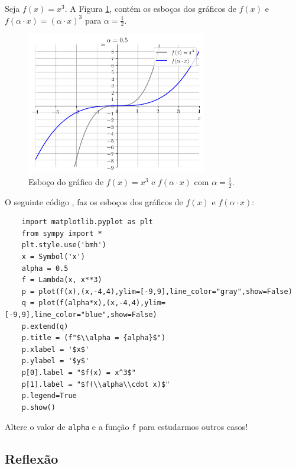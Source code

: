 \begin{ex}
  Seja $f(x) = x^3$. A Figura \ref{fig:ex_dilahoriz}, contém os esboços dos gráficos de $f(x)$ e $f(\alpha\cdot x) = (\alpha \cdot x)^3$ para $\alpha = \frac{1}{2}$.

  \begin{figure}[H]
    \centering
    \includegraphics[width=0.7\textwidth]{./cap_funcao/dados/fig_ex_dilahoriz/fig_ex_dilahoriz}
    \caption{Esboço do gráfico de $f(x) = x^3$ e $f(\alpha\cdot x)$ com $\alpha=\frac{1}{2}$.}
    \label{fig:ex_dilahoriz}
  \end{figure}

  \ifispython
  O seguinte código {\python}, faz os esboços dos gráficos de $f(x)$ e $f(\alpha\cdot x)$:
  \begin{lstlisting}
    import matplotlib.pyplot as plt
    from sympy import *
    plt.style.use('bmh')
    x = Symbol('x')
    alpha = 0.5
    f = Lambda(x, x**3)
    p = plot(f(x),(x,-4,4),ylim=[-9,9],line_color="gray",show=False)
    q = plot(f(alpha*x),(x,-4,4),ylim=[-9,9],line_color="blue",show=False)
    p.extend(q)
    p.title = (f"$\\alpha = {alpha}$")
    p.xlabel = '$x$'
    p.ylabel = '$y$'
    p[0].label = "$f(x) = x^3$"
    p[1].label = "$f(\\alpha\\cdot x)$"
    p.legend=True
    p.show()    
  \end{lstlisting}
  Altere o valor de \verb+alpha+ e a função \verb+f+ para estudarmos outros casos!
  \fi
\end{ex}


\subsection{Reflexão}

